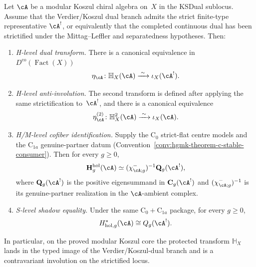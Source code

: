 \begin{theorem}
Let $\cA$ be a modular Koszul chiral algebra on~$X$ in the KSDual
sublocus.
Assume that the Verdier/Koszul dual branch admits the strict
finite-type representative $\cA^!$, or equivalently that the completed
continuous dual has been strictified under the Mittag--Leffler and
separatedness hypotheses.
Then:
\begin{enumerate}[label=\textup{(\roman*)}]
\item \emph{H-level dual transform.}
 There is a canonical equivalence in
 $D^{\mathrm{co}}(\operatorname{Fact}(X))$
 \begin{equation}\label{eq:frontier-holographic-koszul-dual}
 \eta_\cA\colon
 \mathbb H_X(\cA)\xrightarrow{\;\sim\;} \iota_X(\cA^!).
 \end{equation}
\item \emph{H-level anti-involution.}
 The second transform is defined after applying the same strictification
 to~$\cA^!$, and there is a canonical equivalence
 \begin{equation}\label{eq:frontier-holographic-double-transform}
 \eta_\cA^{(2)}\colon
 \mathbb H_X^2(\cA)\xrightarrow{\;\sim\;} \iota_X(\cA).
 \end{equation}
\item \emph{H/M-level cofiber identification.}
 Supply the $\mathrm C_0$ strict-flat centre models and the
 $\mathrm C_{1a}$ genuine-partner datum
 \textup{(}Convention~\textup{\ref{conv:hgmk-theorem-c-stable-consumer}}\textup{)}.
 Then for every $g\ge 0$,
 \begin{equation}\label{eq:frontier-holographic-cofiber-identification}
 \mathbf H^{\mathrm{hol}}_g(\cA)
 \simeq
 (\chi^-_{\cA;g})^{-1}\mathbf Q_g(\cA^!),
 \end{equation}
 where $\mathbf Q_g(\cA^!)$ is the positive eigensummand in
 $\mathbf C_g(\cA^!)$ and $(\chi^-_{\cA;g})^{-1}$ is its
 genuine-partner realization in the $\cA$-ambient complex.
\item \emph{S-level shadow equality.}
 Under the same $\mathrm C_0+\mathrm C_{1a}$ package, for every
 $g\ge 0$,
 \begin{equation}\label{eq:frontier-holographic-shadow-equality}
 H^*_{\mathrm{hol},g}(\cA)\cong Q_g(\cA^!).
 \end{equation}
\end{enumerate}
In particular, on the proved modular Koszul core the protected transform
$\mathbb H_X$ lands in the typed image of the Verdier/Koszul-dual branch
and is a contravariant involution on the strictified locus.
\end{theorem}

